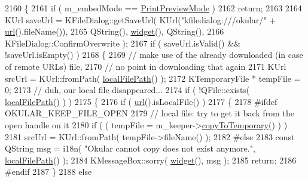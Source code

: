 \begin{DoxyCode}
2160 \{
2161     \textcolor{keywordflow}{if} ( m\_embedMode == \hyperlink{namespaceOkular_adbe21e337d65d3f5f07a441180428ba8a3c886e44dadfdb624559818a85d90b94}{PrintPreviewMode} )
2162        \textcolor{keywordflow}{return};
2163 
2164     KUrl saveUrl = KFileDialog::getSaveUrl( KUrl(\textcolor{stringliteral}{"kfiledialog:///okular/"} + \hyperlink{classKParts_1_1ReadOnlyPart_aba05c3b2fd42dcfebc6585e4f746d2cb}{url}().fileName()),
2165                                             QString(), \hyperlink{classKParts_1_1Part_a134900cb0605a1cd5113d90954a01fdf}{widget}(), QString(),
2166                                             KFileDialog::ConfirmOverwrite );
2167     \textcolor{keywordflow}{if} ( saveUrl.isValid() && !saveUrl.isEmpty() )
2168     \{
2169         \textcolor{comment}{// make use of the already downloaded (in case of remote URLs) file,}
2170         \textcolor{comment}{// no point in downloading that again}
2171         KUrl srcUrl = KUrl::fromPath( \hyperlink{classKParts_1_1ReadOnlyPart_a9c411f8471de1a852c8595719d179946}{localFilePath}() );
2172         KTemporaryFile * tempFile = 0;
2173         \textcolor{comment}{// duh, our local file disappeared...}
2174         \textcolor{keywordflow}{if} ( !QFile::exists( \hyperlink{classKParts_1_1ReadOnlyPart_a9c411f8471de1a852c8595719d179946}{localFilePath}() ) )
2175         \{
2176             \textcolor{keywordflow}{if} ( \hyperlink{classKParts_1_1ReadOnlyPart_aba05c3b2fd42dcfebc6585e4f746d2cb}{url}().isLocalFile() )
2177             \{
2178 \textcolor{preprocessor}{#ifdef OKULAR\_KEEP\_FILE\_OPEN}
2179                 \textcolor{comment}{// local file: try to get it back from the open handle on it}
2180                 \textcolor{keywordflow}{if} ( ( tempFile = m\_keeper->\hyperlink{classFileKeeper_a092bef1d85c7b7ecb5f13794a493f096}{copyToTemporary}() ) )
2181                     srcUrl = KUrl::fromPath( tempFile->fileName() );
2182 \textcolor{preprocessor}{#else}
2183                 \textcolor{keyword}{const} QString msg = i18n( \textcolor{stringliteral}{"Okular cannot copy %
       does not exist anymore."}, \hyperlink{classKParts_1_1ReadOnlyPart_a9c411f8471de1a852c8595719d179946}{localFilePath}() );
2184                 KMessageBox::sorry( \hyperlink{classKParts_1_1Part_a134900cb0605a1cd5113d90954a01fdf}{widget}(), msg );
2185                 \textcolor{keywordflow}{return};
2186 \textcolor{preprocessor}{#endif}
2187             \}
2188             \textcolor{keywordflow}{else}

\end{DoxyCode}
